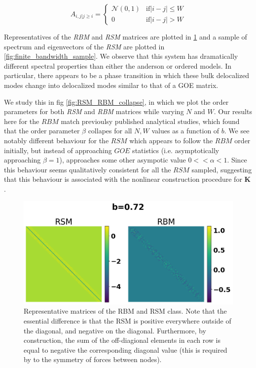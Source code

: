 \documentclass{article}
\begin{document}
\begin{equation}\label{eq:finite_bandwidth_adjacency}
	A_{i,j|j\geq i} = \begin{cases}
		\mathcal{N}(0, 1) & \text{if} \left| i-j \right| \leq W \\	
		0 & \text{if} \left| i-j \right| > W 
	\end{cases}
\end{equation}

Representatives of the \textit{RBM} and \textit{RSM} matrices are plotted in \ref{fig:finite_bandwidth_K} and a sample of spectrum and eigenvectors of the \textit{RSM} are plotted in \ref{fig:finite_bandwidth_sample}.
We observe that this system has dramatically different spectral properties than either the anderson or ordered models. 
In particular, there appears to be a phase transition in which these bulk delocalized modes change into delocalized modes similar to that of a  
GOE matrix.

We study this in fig  \ref{fig:RSM_RBM_collapse}, in which we plot the order parameters for both \textit{RSM} and \textit{RBM} matrices while
varying $N$ and $W$.
Our results here for the $RBM$ match previoulsy published analytical studies, which found that the order parameter $\beta$ collapes for all $N, W$ values as a function of $b$.
We see notably different behaviour for the $RSM$ which appears to follow the $RBM$ order initially, but instead of approaching 
$GOE$ statistics (i.e. asymptotically approaching $\beta=1$), approaches some other asympotic value $0<<\alpha <1$.
Since this behaviour seems qualitatively consistent for all the $RSM$ sampled, 
suggesting that this behaviour is associated with the nonlinear construction procedure for $\bm{K}$.

\begin{figure}
\begin{center}
	\includegraphics[width=.6\textwidth]{Figures/rsm_rbm_example.png}
\end{center}
\caption{Representative matrices of the RBM and RSM class. 
Note that the essential difference is that the RSM is positive everywhere outside of the diagonal, and negative on the diagonal.
Furthermore, by construction, the sum of the off-diagional elements in each row is equal to negative the corresponding diagonal value (this is required by to the symmetry of forces between nodes).}
\label{fig:finite_bandwidth_K}
\end{figure}
\end{document}
